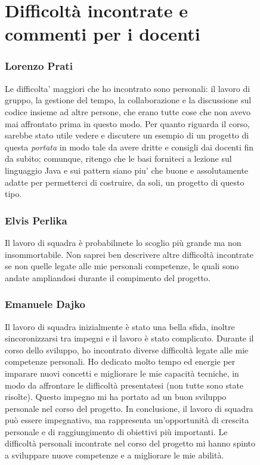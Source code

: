 \documentclass[a4paper,12pt]{report}
\begin{document}
\begin{figure}[h]
\section{Difficoltà incontrate e commenti per i docenti}

\subsubsection{Lorenzo Prati}
Le difficolta' maggiori che ho incontrato sono personali: il lavoro di gruppo, la gestione del tempo, la collaborazione e la discussione sul codice insieme ad altre persone, che erano tutte cose che non avevo mai affrontato prima in questo modo. Per quanto riguarda il corso, sarebbe stato utile vedere e discutere un esempio di un progetto di questa \textit{portata} in modo tale da avere dritte e consigli dai docenti fin da subito; comunque, ritengo che le basi forniteci a lezione sul linguaggio Java e sui pattern siano piu' che buone e assolutamente adatte per permetterci di costruire, da soli, un progetto di questo tipo.

\subsubsection{Elvis Perlika}
Il lavoro di squadra è probabilmete lo scoglio più grande ma non insommortabile.
Non saprei ben descrivere altre difficoltà incontrate se non quelle legate 
alle mie personali competenze, le quali sono andate ampliandosi durante il compimento del progetto.

\subsubsection{Emanuele Dajko}
Il lavoro di squadra inizialmente è stato una bella sfida, inoltre sincoronizzarsi tra impegni e il lavoro è stato complicato.
Durante il corso dello sviluppo, ho incontrato diverse difficoltà legate alle mie competenze personali.
Ho dedicato molto tempo ed energie per imparare nuovi concetti e migliorare le mie capacità tecniche, in modo da affrontare le difficoltà presentatesi (non tutte sono state risolte).
Questo impegno mi ha portato ad un buon sviluppo personale nel corso del progetto.
In conclusione, il lavoro di squadra può essere impegnativo, ma rappresenta un'opportunità di crescita personale e di raggiungimento di obiettivi più importanti.
Le difficoltà personali incontrate nel corso del progetto mi hanno spinto a sviluppare nuove competenze e a migliorare le mie abilità.


\end{figure}
\end{document}
